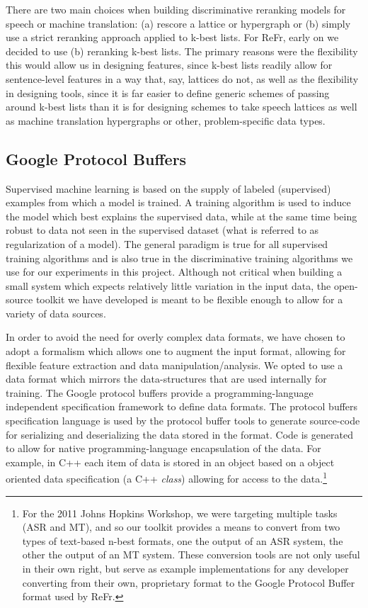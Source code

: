 \documentclass[a4paper]{article}
\begin{document}
There are two main choices when building discriminative reranking
models for speech or machine translation: (a) rescore a lattice or
hypergraph or (b) simply use a strict reranking approach applied to
k-best lists. For ReFr, early on we decided to use (b) reranking
k-best lists. The primary reasons were the flexibility this would
allow us in designing features, since k-best lists readily allow for
sentence-level features in a way that, say, lattices do not, as well
as the flexibility in designing tools, since it is far easier to
define generic schemes of passing around k-best lists than it is for
designing schemes to take speech lattices as well as machine
translation hypergraphs or other, problem-specific data types.


\subsection{\label{sub:protobufs}Google Protocol Buffers}

Supervised machine learning is based on the supply of labeled (supervised)
examples from which a model is trained.  A training algorithm is used to induce
the model which best explains the supervised data, while at the same time being
robust to data not seen in the supervised dataset (what is referred to as
regularization of a model).  The general paradigm is true for all supervised
training algorithms and is also true in the discriminative training algorithms
we use for our experiments in this project. Although not critical when building
a small system which expects relatively little variation in the input data, the
open-source toolkit we have developed is meant to be flexible enough to allow
for a variety of data sources.

In order to avoid the need for overly complex data formats, we have
chosen to adopt a formalism which allows one to augment the input
format, allowing for flexible feature extraction and data manipulation/analysis.
We opted to use a data format which mirrors the data-structures that
are used internally for training. The Google protocol buffers\cite{protobuf}
provide a programming-language independent specification framework
to define data formats. The protocol buffers specification language
is used by the protocol buffer tools to generate source-code for serializing
and deserializing the data stored in the format. Code is generated
to allow for native programming-language encapsulation of the data.
For example, in C++ each item of data is stored in an object based
on a object oriented data specification (a C++ \emph{class}) allowing
for access to the data.\footnote{For the 2011 Johns Hopkins Workshop, we were targeting multiple tasks (ASR and MT), and so our toolkit provides a means to convert from two types of text-based n-best formats, one the output of an ASR system, the other the output of an MT system.  These conversion tools are not only useful in their own right, but serve as example implementations for any developer converting from their own, proprietary format to the Google Protocol Buffer format used by ReFr.}
\end{document}
